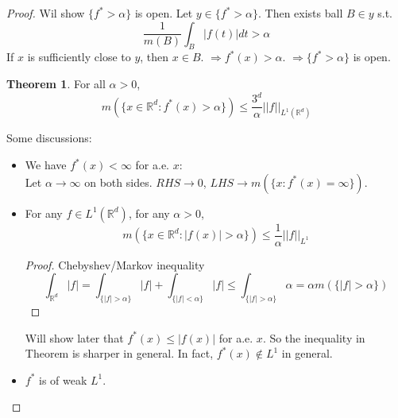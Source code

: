 \documentclass{article}
\theoremstyle{definition}
\newtheorem{thm}{Theorem}
\begin{document}
  \begin{proof}
    Wil show $\{f^*>\alpha\}$ is open. Let $y \in \{f^* > \alpha \}$. Then exists ball $B \in y$ s.t. 
    $$\frac{1}{m(B)} \int _B |f(t)|dt > \alpha$$
    If $x$ is sufficiently close to $y$, then $x \in B$. $\Rightarrow f^*(x) > \alpha$. $\Rightarrow \{ f^* > \alpha \}$ is open. 
    \begin{thm}
      For all $\alpha > 0$, 
      $$m(\{x \in \mathbb{R}^d: f^*(x) > \alpha \} ) \leq \frac{3^d}{\alpha} ||f||_{L^1(\mathbb{R}^d)}$$

    \end{thm}
    Some discussions:\\
    \begin{itemize}
      \item We have $f^*(x) < \infty$ for a.e. $x$:\\
        Let $\alpha \to \infty$ on both sides. $RHS \to 0$, $LHS \to m(\{x: f^*(x) = \infty\})$.\\
      \item For any $f \in L^1(\mathbb{R}^d)$, for any $\alpha > 0$, 
    \begin{equation}
      m(\{x \in \mathbb{R}^d: |f(x)| > \alpha \}) \leq \frac{1}{\alpha} ||f||_{L^1}
      \label{eq:}
    \end{equation}
    \begin{proof}
      Chebyshev/Markov inequality
      $$\int_{\mathbb{R}^d} |f| = \int_{\{|f|>\alpha\}} |f| + \int_{\{|f| < \alpha\}} |f| \leq \int_{\{|f| > \alpha\}} \alpha = \alpha m(\{|f|>\alpha\})$$
    \end{proof}
    Will show later that $f^*(x) \leq |f(x)|$ for a.e. $x$. So the inequality in Theorem is sharper in general. In fact, $f^*(x) \notin L^1$ in general.\\
  \item $f^*$ is of weak $L^1$. \\
    \end{itemize}
  \end{proof}
\end{document}
